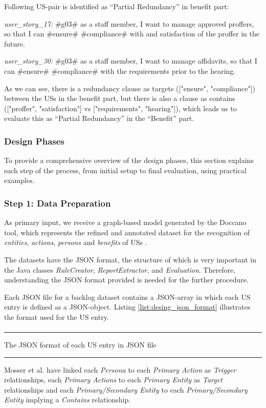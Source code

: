 \begin{example}
	Following US-pair is identified as \enquote{Partial Redundancy} in benefit part:
	
	\textit{user\_story\_17:} \#g03\# as a staff member, I want to manage approved proffers, so that I can \#ensure\# \#compliance\# with and satisfaction of the proffer in the future.
	
	\textit{user\_story\_30:} \#g03\# as a staff member, I want to manage affidavits, so that I can \#ensure\# \#compliance\# with the requirements prior to the hearing.
	
	As we can see, there is a redundancy clause as targets (["ensure", "compliance"]) between the USs in the benefit part, but there is also a clause as contains (["proffer", "satisfaction"] vs ["requirements", "hearing"]), which leads us to evaluate this as \enquote{Partial Redundancy} in the \enquote{Benefit} part.
\end{example}
\subsubsection*{Design Phases}\label{design_phases}
To provide a comprehensive overview of the design phases, this section explains each step of the process, from initial setup to final evaluation, using practical examples.
\subsubsection*{Step 1: Data Preparation}\label{design_step_1}
As primary input, we receive a graph-based model generated by the Doccano tool, which represents the refined and annotated dataset for the recognition of \emph{entities}, \emph{actions}, \emph{persons} and \emph{benefits} of USs \cite{arulmohan2023extracting}.

The datasets have the JSON format, the structure of which is very important in the Java classes \textit{RuleCreator}, \textit{ReportExtractor}, and \textit{Evaluation}. Therefore, understanding the JSON format provided is needed for the further procedure.

Each JSON file for a backlog dataset contains a JSON-array in which each US entry is defined as a JSON-object. Listing \ref{list:desing_json_format} illustrates the format used for the US entry.
\begin{MyListing}
	\paragraph{}
	\hrule
	\centering
	
	\caption{The JSON format of each US entry in JSON file}\label{list:desing_json_format}
	\hrule
\end{MyListing}
Mosser et al. have linked each \emph{Persona} to each \emph{Primary Action} as \emph{Trigger} relationships, each \emph{Primary Actions} to each \emph{Primary Entity} as \emph{Target} relationships and each \emph{Primary/Secondary Entity} to each \emph{Primary/Secondary Entity} implying a \emph{Contains} relationship\cite{arulmohan2023extracting}.

